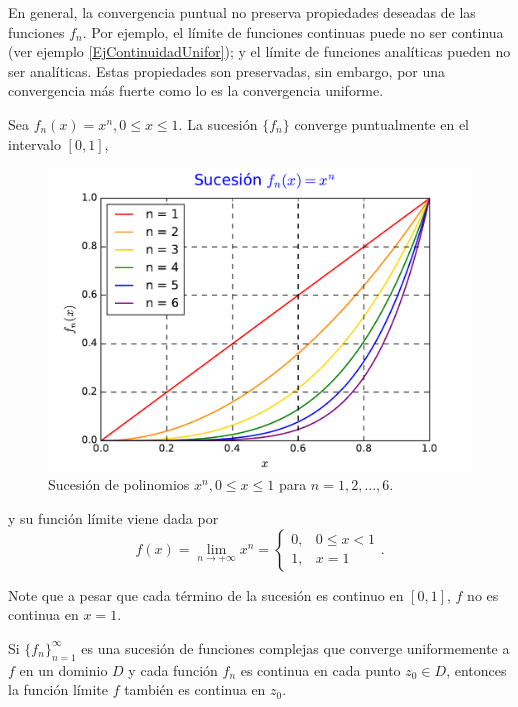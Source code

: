 En general, la convergencia puntual no preserva propiedades deseadas de las funciones $f_n$. Por ejemplo, el límite de funciones continuas puede no ser continua (ver ejemplo \ref{EjContinuidadUnifor}); y el límite de funciones analíticas pueden no ser analíticas. Estas propiedades son preservadas, sin embargo, por una convergencia más fuerte como lo es la convergencia uniforme.

\begin{ejemplo} \label{EjContinuidadUnifor}
Sea $f_n(x) = x^n, 0 \leq x \leq 1$. La sucesión $\{f_n\}$ converge puntualmente en el intervalo $[0,1]$,

\begin{figure}[H]
\begin{center}
\includegraphics[scale=0.6]{Figuras/SucesionPolinomios.pdf}
\caption{Sucesión de polinomios $x^n, 0 \leq x \leq 1$ para $n = 1,2, \dots,6$.}
\end{center}
\end{figure}
\vspace{-0.7cm}

 y su función límite viene dada por
$$f(x) = \lim_{n\to + \infty} x^n = \left\{ \begin{array}{cl}
0,& 0 \leq x < 1 \\
1 ,& x = 1
\end{array} \right. .$$

Note que a pesar que cada término de la sucesión es continuo en $[0,1]$, $f$ no es continua en $x = 1$.
\end{ejemplo}

\begin{teorema}\label{UniformeContinuo}
Si $\{f_n\}_{n=1}^{\infty}$ es una sucesión de funciones complejas que converge uniformemente a $f$ en un dominio $D$ y cada función $f_n$ es continua en cada punto $z_0 \in D$, entonces la función límite $f$ también es continua en $z_0$.
\end{teorema}

